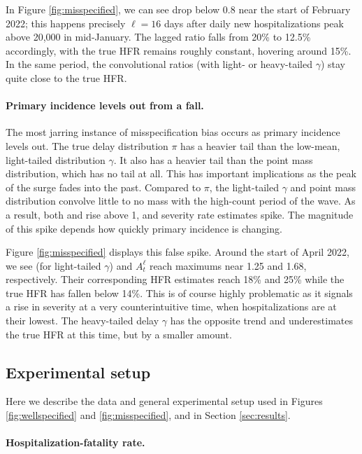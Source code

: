 \documentclass{article}
\begin{document}
In Figure \ref{fig:misspecified}, we can see  drop below 0.8
near the start of February 2022; this happens precisely $\ell=16$ days after
daily new hospitalizations peak above 20,000 in mid-January. The lagged 
ratio falls from 20\% to 12.5\% accordingly, with the true HFR remains roughly
constant, hovering around 15\%. In the same period, the convolutional ratios
(with light- or heavy-tailed $\gamma$) stay quite close to the true HFR.   

\paragraph{Primary incidence levels out from a fall.}

The most jarring instance of misspecification bias occurs as primary incidence
levels out. The true delay distribution $\pi$ has a heavier tail than the
low-mean, light-tailed distribution $\gamma$. It also has a heavier tail than
the point mass distribution, which has no tail at all. This has important
implications as the peak of the surge fades into the past. Compared to $\pi$,
the light-tailed $\gamma$ and point mass distribution convolve little to no mass
with the high-count period of the wave. As a result, both   
and  rise above 1, and severity rate estimates spike. The
magnitude of this spike depends how quickly primary incidence is changing. 

Figure \ref{fig:misspecified} displays this false spike. Around the start of April 2022,
we see  (for light-tailed $\gamma$) and $A_t^\ell$ reach 
maximums near 1.25 and 1.68, respectively. Their corresponding HFR estimates reach
18\% and 25\% while the true HFR has fallen below 14\%. This is of course highly 
problematic as it signals a rise in severity at a very counterintuitive time,
when hospitalizations are at their lowest. The heavy-tailed delay $\gamma$ has
the opposite trend and underestimates the true HFR at this time, but by a
smaller amount. 

\subsection{Experimental setup}
\label{sec:setup}

Here we describe the data and general experimental setup used in Figures
\ref{fig:wellspecified} and \ref{fig:misspecified}, and in Section
\ref{sec:results}.    

\paragraph{Hospitalization-fatality rate.}
\end{document}
